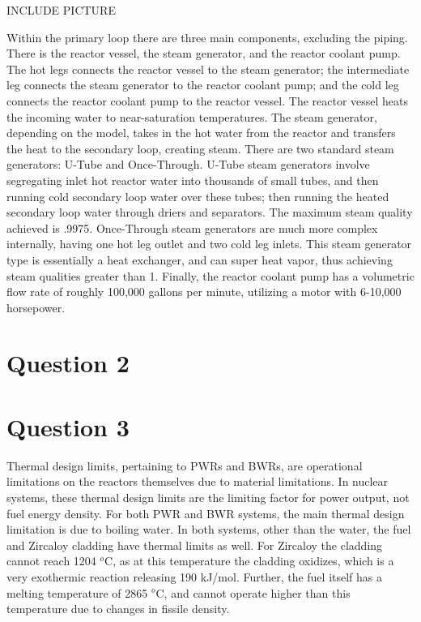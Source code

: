 \documentclass{article}
\begin{document}
INCLUDE PICTURE

Within the primary loop there are three main components, excluding the piping. There is the reactor vessel, the steam generator, and the reactor coolant pump. The hot legs connects the reactor vessel to the steam generator; the intermediate leg connects the steam generator to the reactor coolant pump; and the cold leg connects the reactor coolant pump to the reactor vessel. The reactor vessel heats the incoming water to near-saturation temperatures. The steam generator, depending on the model, takes in the hot water from the reactor and transfers the heat to the secondary loop, creating steam. There are two standard steam generators: U-Tube and Once-Through. U-Tube steam generators involve segregating inlet hot reactor water into thousands of small tubes, and then running cold secondary loop water over these tubes; then running the heated secondary loop water through driers and separators. The maximum steam quality achieved is .9975. Once-Through steam generators are much more complex internally, having one hot leg outlet and two cold leg inlets. This steam generator type is essentially a heat exchanger, and can super heat vapor, thus achieving steam qualities greater than 1. Finally, the reactor coolant pump has a volumetric flow rate of roughly 100,000 gallons per minute, utilizing a motor with 6-10,000 horsepower. 

\section*{Question 2}


\section*{Question 3}

Thermal design limits, pertaining to PWRs and BWRs, are operational limitations on the reactors themselves due to material limitations. In nuclear systems, these thermal design limits are the limiting factor for power output, not fuel energy density. For both PWR and BWR systems, the main thermal design limitation is due to boiling water.  In both systems, other than the water, the fuel and Zircaloy cladding have thermal limits as well. For Zircaloy the cladding cannot reach 1204 $^o$C, as at this temperature the cladding oxidizes, which is a very exothermic reaction releasing 190 kJ/mol. Further, the fuel itself has a melting temperature of 2865 $^o$C, and cannot operate higher than this temperature due to changes in fissile density.  
\end{document}
